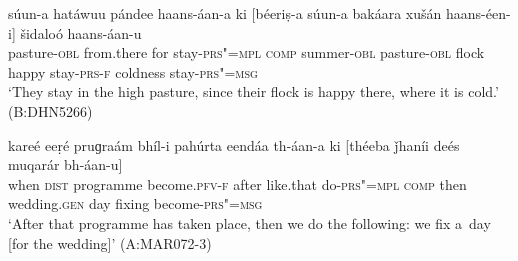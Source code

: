 \begin{exe}
\ex
\label{ex:13-235}
\gll súun-a hatáwuu pándee haans-áan-a ki  [béeriṣ-a súun-a bakáara
  xušán haans-éen-i]  šidaloó haans-áan-u \\
pasture-\textsc{obl} from.there for stay-\textsc{prs"=mpl} \textsc{comp}  summer-\textsc{obl} pasture-\textsc{obl} flock happy stay-\textsc{prs-f} coldness stay-\textsc{prs"=msg} \\
\glt `They stay in the high pasture, since their flock is happy there, where it is cold.' (B:DHN5266)

\ex
\label{ex:13-236}
\gll kareé eeṛé pruɡraám bhíl-i pahúrta eendáa  th-áan-a ki [théeba
  ǰhaníi deés muqarár  bh-áan-u] \\
when \textsc{dist} programme become.\textsc{pfv-f} after like.that  do-\textsc{prs"=mpl} \textsc{comp} then wedding.\textsc{gen} day fixing become-\textsc{prs"=msg} \\
\glt `After that programme has taken place, then we do the following: we fix a~day [for the wedding]' (A:MAR072-3)
\end{exe}